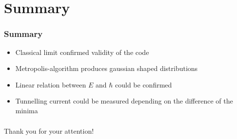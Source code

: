 \documentclass[aspectratio=169]{beamer}
\begin{document}
\section{Summary}
\begin{frame}
	\frametitle{Summary}
	\begin{itemize}
		\item Classical limit confirmed validity of the code
		\item Metropolis-algorithm produces gaussian shaped distributions
		\item Linear relation between $E$ and $\hbar$ could be confirmed
		\item Tunnelling current could be measured depending on the difference of the minima
	\end{itemize}
\end{frame}


\begin{frame}
\frametitle{}
\begin{center}
	Thank you for your attention!
\end{center}
\end{frame}
\end{document}
